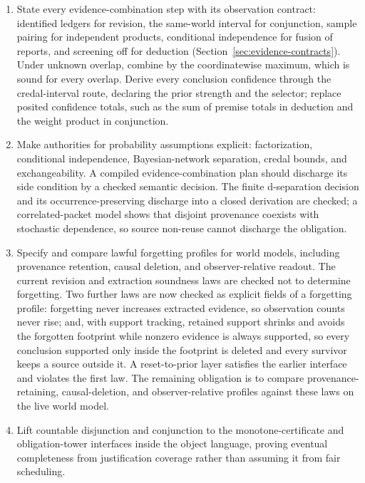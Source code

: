 \documentclass[11pt]{article}
\theoremstyle{definition}
\theoremstyle{remark}
\begin{document}
\begin{enumerate}
\item State every evidence-combination step with its observation contract:
  identified ledgers for revision, the same-world interval for conjunction,
  sample pairing for independent products, conditional independence for
  fusion of reports, and screening off for deduction
  (Section~\ref{sec:evidence-contracts}).  Under unknown overlap, combine by
  the coordinatewise maximum, which is sound for every overlap.  Derive every
  conclusion confidence through the credal-interval route, declaring the prior
  strength and the selector; replace posited confidence totals, such as the
  sum of premise totals in deduction and the weight product in conjunction.
\item Make authorities for probability assumptions explicit: factorization,
  conditional independence, Bayesian-network separation, credal bounds, and
  exchangeability. A compiled evidence-combination plan should discharge
  its side condition by a checked semantic decision.  The finite
  d-separation decision and its occurrence-preserving discharge into a closed
  derivation are checked; a correlated-packet model shows that disjoint
  provenance coexists with stochastic dependence, so source non-reuse cannot
  discharge the obligation.
\item Specify and compare lawful forgetting profiles for world models,
  including provenance retention, causal deletion, and observer-relative
  readout.  The current revision and extraction soundness laws are checked not
  to determine forgetting.  Two further laws are now checked as explicit
  fields of a forgetting profile: forgetting never increases extracted
  evidence, so observation counts never rise; and, with support tracking,
  retained support shrinks and avoids the forgotten footprint while nonzero
  evidence is always supported, so every conclusion supported only inside the
  footprint is deleted and every survivor keeps a source outside it.  A
  reset-to-prior layer satisfies the earlier interface and violates the first
  law.  The remaining obligation is to compare provenance-retaining,
  causal-deletion, and observer-relative profiles against these laws on the
  live world model.
\item Lift countable disjunction and conjunction to the monotone-certificate
  and obligation-tower interfaces inside the object language, proving eventual
  completeness from justification coverage rather than assuming it from fair
  scheduling.
\end{enumerate}
\end{document}
